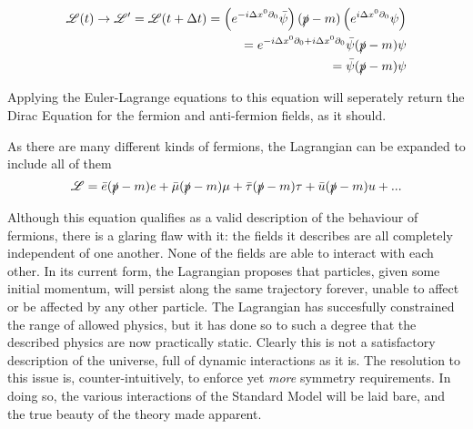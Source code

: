     \begin{equation} \begin{split}
        \mathscr{L}(t) \to \mathscr{L}' = \mathscr{L}(t+\Delta t) =
            \left( e^{-i\Delta x^0 \partial_0} \bar{\psi} \right) (\slashed{p} - m) \left( e^{i\Delta x^0 \partial_0}\psi \right)
        \\  = e^{-i\Delta x^0 \partial_0 + i \Delta x^0 \partial_0} \bar{\psi} (\slashed{p} - m) \psi
        \\  = \bar{\psi} (\slashed{p} - m) \psi
    \end{split} \end{equation}

    Applying the Euler-Lagrange equations to this equation will seperately return the Dirac Equation
        for the fermion and anti-fermion fields, as it should.

    As there are many different kinds of fermions, the Lagrangian can be expanded to include all of them
    \begin{equation}
        \mathscr{L} = \bar{e} (\slashed{p} - m) e
        + \bar{\mu} (\slashed{p} - m) \mu
        + \bar{\tau} (\slashed{p} - m) \tau
        + \bar{u} (\slashed{p} - m) u
        + ...
    \end{equation}

    Although this equation qualifies as a valid description of the behaviour of fermions,
        there is a glaring flaw with it: the fields it describes are all completely independent of one another.
    None of the fields are able to interact with each other.
    In its current form, the Lagrangian proposes that particles, given some initial momentum,
        will persist along the same trajectory forever, unable to affect or be affected by any other particle.
    The Lagrangian has succesfully constrained the range of allowed physics,
        but it has done so to such a degree that the described physics are now practically static.
    Clearly this is not a satisfactory description of the universe, full of dynamic interactions as it is.
    The resolution to this issue is, counter-intuitively, to enforce yet \textit{more} symmetry requirements.
    In doing so, the various interactions of the Standard Model will be laid bare,
        and the true beauty of the theory made apparent.



